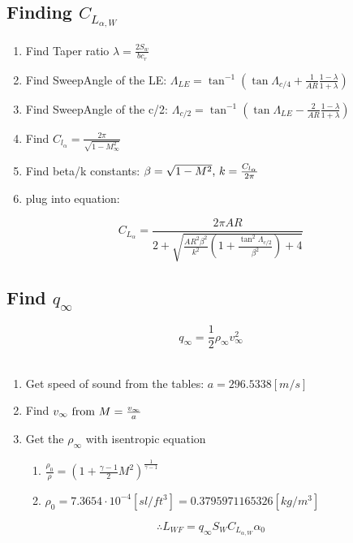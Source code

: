 \documentclass[a4paper, twoside]{article}
\begin{document}
\subsection{Finding \(C_{L_{\alpha,W}}\)}
\begin{enumerate}
\item Find Taper ratio \(\lambda = \frac{2S_w}{bc_r}\)\\
\item Find SweepAngle of the LE: \(\Lambda_{LE} = \tan^{-1}\left(\tan{\Lambda_{c/4}} + \frac{1}{AR}\frac{1-\lambda}{1+\lambda}\right)\)\\
\item Find SweepAngle of the c/2: \(\Lambda_{c/2} = \tan^{-1}\left(\tan{\Lambda_{LE}} - \frac{2}{AR}\frac{1-\lambda}{1+\lambda}\right)\)\\
\item Find \(C_{l_\alpha} = \frac{2\pi}{\sqrt{1-M_\infty^2}}\)\\
\item Find beta/k constants: \(\beta = \sqrt{1-M^2}$, $k = \frac{C_{l_\alpha}}{2\pi}\)\\
\item plug into equation:
\end{enumerate}
\[C_{L_\alpha} = \frac{2\pi AR}{2+\sqrt{\frac{AR^2\beta^2}{k^2}\left(1+\frac{\tan^2{\Lambda_{c/2}}}{\beta^2}\right)+4}}\]

\subsection{Find \(q_\infty\)}
\[q_\infty = \frac{1}{2} \rho_\infty v_\infty^2\]\\
\begin{enumerate}
\item Get speed of sound from the tables: \(a = 296.5338[m/s]\)\\
\item Find \(v_\infty$ from $M = \frac{v_\infty}{a}\)\\
\item Get the \(\rho_\infty\) with isentropic equation
  \begin{enumerate}
  \item \(\frac{\rho_0}{\rho} = {\left(1+\frac{\gamma-1}{2}M^2\right)}^{\frac{1}{\gamma-1}}\)
  \item \(\rho_0 = 7.3654\cdot10^{-4} [sl/ft^3] = 0.3795971165326[kg/m^3]\)
  \end{enumerate}
\end{enumerate}
\[ \therefore L_{WF} = q_\infty S_W C_{L_{\alpha,W}} \alpha_0\]
\end{document}
